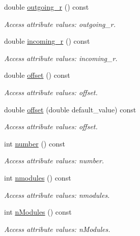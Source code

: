 \begin{DoxyCompactItemize}
double \hyperlink{struct_d_d4hep_1_1_x_m_l_1_1_child_value_a481b0fd5b0b6030a3166511c0576232a}{outgoing\+\_\+r} () const
\begin{DoxyCompactList}\small\item\em Access attribute values\+: outgoing\+\_\+r. \end{DoxyCompactList}\item 
double \hyperlink{struct_d_d4hep_1_1_x_m_l_1_1_child_value_a12c21bbcabb9b6a07764a46fe1e73a3b}{incoming\+\_\+r} () const
\begin{DoxyCompactList}\small\item\em Access attribute values\+: incoming\+\_\+r. \end{DoxyCompactList}\item 
double \hyperlink{struct_d_d4hep_1_1_x_m_l_1_1_child_value_ae75624c6c08fb855e6ff9d62c5dbe87f}{offset} () const
\begin{DoxyCompactList}\small\item\em Access attribute values\+: offset. \end{DoxyCompactList}\item 
double \hyperlink{struct_d_d4hep_1_1_x_m_l_1_1_child_value_a0a5eed030060d7b7c5c9f524c24f66a5}{offset} (double default\+\_\+value) const
\begin{DoxyCompactList}\small\item\em Access attribute values\+: offset. \end{DoxyCompactList}\item 
int \hyperlink{struct_d_d4hep_1_1_x_m_l_1_1_child_value_a975a0b542b943525a998d06c219adb12}{number} () const
\begin{DoxyCompactList}\small\item\em Access attribute values\+: number. \end{DoxyCompactList}\item 
int \hyperlink{struct_d_d4hep_1_1_x_m_l_1_1_child_value_af80204c30405dce5f703c63b9f6f4e0a}{nmodules} () const
\begin{DoxyCompactList}\small\item\em Access attribute values\+: nmodules. \end{DoxyCompactList}\item 
int \hyperlink{struct_d_d4hep_1_1_x_m_l_1_1_child_value_a40b7972cfaea665fcd7dbd6f559006ba}{n\+Modules} () const
\begin{DoxyCompactList}\small\item\em Access attribute values\+: n\+Modules. \end{DoxyCompactList}\item 

\end{DoxyCompactItemize}
